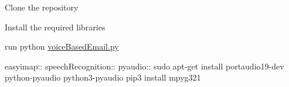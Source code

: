 
\begin{DoxyEnumerate}
\item Clone the repository
\item Install the required libraries
\item run python \hyperlink{voiceBasedEmail_8py}{voice\+Based\+Email.\+py}
\end{DoxyEnumerate}

easyimap\+:\+: speech\+Recognition\+:\+: pyaudio\+:\+: sudo apt-\/get install portaudio19-\/dev python-\/pyaudio python3-\/pyaudio pip3 install mpyg321 